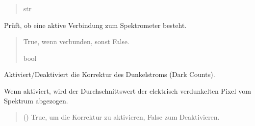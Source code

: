 \documentclass[letterpaper,10pt,english]{sphinxmanual}
\begin{document}
\begin{fulllineitems}
\begin{fulllineitems}
\begin{quote}
\begin{description}
\begin{description}
\end{description}


\sphinxAtStartPar
str

\end{description}\end{quote}

\end{fulllineitems}


\begin{fulllineitems}
\label{\detokenize{modulab/spectrometer_manager:modules.spectrometer.SpectrometerManager.SpectrometerManager.is_connected}}
\pysigstartsignatures
\pysiglinewithargsret
{}
{}
{}
\pysigstopsignatures
\sphinxAtStartPar
Prüft, ob eine aktive Verbindung zum Spektrometer besteht.
\begin{quote}\begin{description}
\sphinxAtStartPar
True, wenn verbunden, sonst False.

\sphinxAtStartPar
bool

\end{description}\end{quote}

\end{fulllineitems}


\begin{fulllineitems}
\label{\detokenize{modulab/spectrometer_manager:modules.spectrometer.SpectrometerManager.SpectrometerManager.set_correction_dark_count}}
\pysigstartsignatures
\pysiglinewithargsret
{}
{}
{}
\pysigstopsignatures
\sphinxAtStartPar
Aktiviert/Deaktiviert die Korrektur des Dunkelstroms (Dark Counts).

\sphinxAtStartPar
Wenn aktiviert, wird der Durchschnittswert der elektrisch verdunkelten
Pixel vom Spektrum abgezogen.
\begin{quote}\begin{description}
\sphinxAtStartPar
{} () \textendash{} True, um die Korrektur zu aktivieren, False zum Deaktivieren.


\end{description}
\end{quote}
\end{fulllineitems}
\end{fulllineitems}
\end{document}
